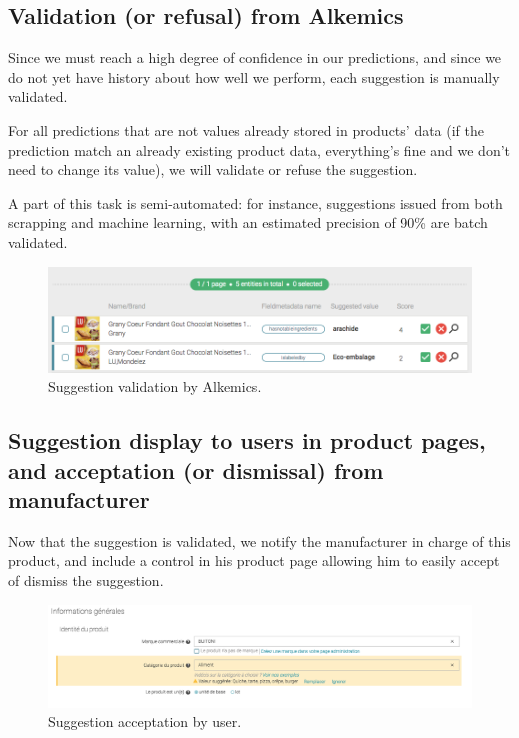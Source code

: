 \subsection{Validation (or refusal) from Alkemics}
Since we must reach a high degree of confidence in our predictions, and since we do not yet have history about how well we perform, each suggestion is manually validated. 


For all predictions that are not values already stored in products' data (if the prediction match an already existing product data, everything's fine and we don't need to change its value), we will validate or refuse the suggestion.

A part of this task is semi-automated: for instance, suggestions issued from both scrapping and machine learning, with an estimated precision of 90\% are batch validated.

\begin{figure}[H]
\centering
\includegraphics[scale=0.50]{./images/workflow/validation-suggestion.png}
\caption{Suggestion validation by Alkemics.}
\end{figure}


\subsection{Suggestion display to users in product pages, and acceptation (or dismissal) from manufacturer}

Now that the suggestion is validated, we notify the manufacturer in charge of this product, and include a control in his product page allowing him to easily accept of dismiss the suggestion.

\begin{figure}[H]
\centering
\includegraphics[scale=0.35]{./images/workflow/stream-suggestion-3.png}
\caption{Suggestion acceptation by user.}
\end{figure}

